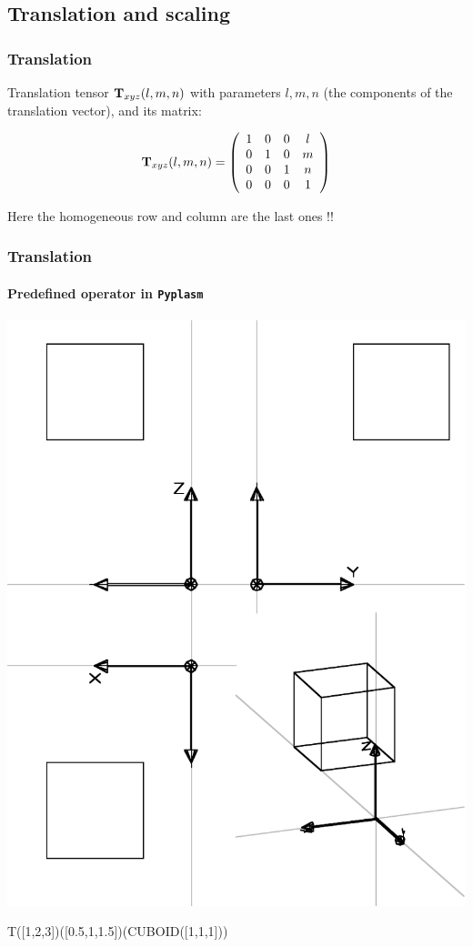 \documentclass{beamer}
\begin{document}
\subsection{Translation and scaling}
\begin{frame}\frametitle{Translation}

\vfill

\alert{Translation} tensor ${\bf T}_{xyz}(l,m,n)$ with parameters $l, m, n$ (the components of the translation vector), and its matrix:

\vfill

\[
{\bf T}_{xyz}(l,m,n) =
{\left(\begin{array}{cccccccccccccccccccccccccccc}
1 & 0 & 0 & l\\
0 & 1 & 0 & m\\
0 & 0 & 1 & n\\
0 & 0 & 0 & 1
\end{array}\right)}\]

\vfill


\begin{remark}
Here the homogeneous row and column are the last ones !!
\end{remark}

\end{frame}
\begin{frame}[fragile]
\frametitle{Translation}
\framesubtitle{Predefined operator in \texttt{Pyplasm}}


\vfill

\centering\includegraphics[width=0.4\linewidth]{figs/cube-t}

\vfill

\begin{python}
  T([1,2,3])([0.5,1,1.5])(CUBOID([1,1,1]))
\end{python}


\end{frame}
\end{document}
